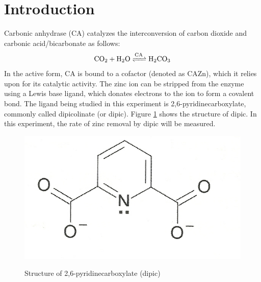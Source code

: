 \section{Introduction}
Carbonic anhydrase (CA) catalyzes the interconversion of carbon dioxide and carbonic acid/bicarbonate as follows:
\begin{align}\label{eqn:ca_reaction}
\ce{CO_2 + H_2O 
<=>[\ce{CA}] 
H_2CO_3}
\end{align}
In the active form, CA is bound to a  cofactor (denoted as CA{\sbt}Zn), which it relies upon for its catalytic activity. The zinc ion can be stripped from the enzyme using a Lewis base ligand, which donates electrons to the ion to form a covalent bond. The ligand being studied in this experiment is 2,6-pyridinecarboxylate, commonly called dipicolinate (or dipic). Figure \ref{fig:dipic} shows the structure of dipic. In this experiment, the rate of zinc removal by dipic will be measured.
\begin{figure}[h]
  \includegraphics[scale=0.5]{./Figures/dipic.jpg}\\
  \caption{Structure of 2,6-pyridinecarboxylate (dipic)\cite{bib:lab_manual}}\label{fig:dipic}
\end{figure}
 
